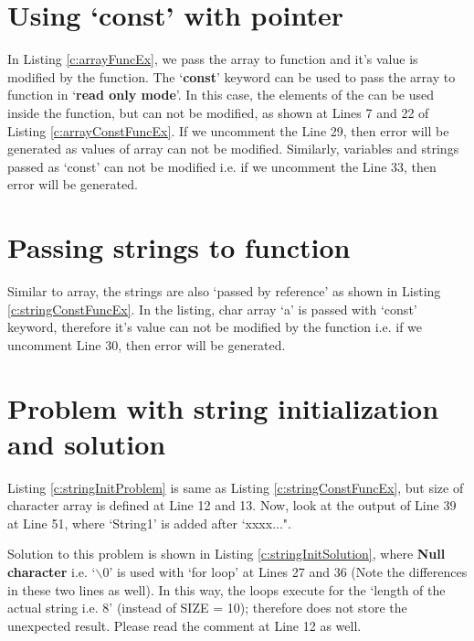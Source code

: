 
\section{Using `const' with pointer}
In Listing \ref{c:arrayFuncEx}, we pass the array to function and it's value is modified by the function. The `\textbf{const}' keyword can be used to pass the array to function in `\textbf{read only mode}'. In this case, the elements of the can be used inside the function, but can not be modified, as shown at Lines 7 and 22 of Listing \ref{c:arrayConstFuncEx}. If we uncomment the Line 29, then error will be generated as values of array can not be modified. Similarly, variables and strings passed as `const' can not be modified i.e. if we uncomment the Line 33, then error will be generated. 



\section{Passing strings to function}
Similar to array, the strings are also `passed by reference' as shown in Listing \ref{c:stringConstFuncEx}. In the listing, char array `a' is passed with `const' keyword, therefore it's value can not be modified by the function i.e. if we uncomment Line 30, then error will be generated.  



\section{Problem with string initialization and solution}
Listing \ref{c:stringInitProblem} is same as Listing \ref{c:stringConstFuncEx}, but size of character array is defined at Line 12 and 13. Now, look at the output of Line 39 at Line 51, where `String1' is added after `xxxx...".
\begin{noNumBox}
	 Solution to this problem is shown in Listing \ref{c:stringInitSolution}, where \textbf{Null character} i.e. `$\backslash 0$' is used with `for loop' at Lines 27 and 36 (Note the differences in these two lines as well).  In this way, the loops execute for the `length of the actual string i.e. 8' (instead of SIZE = 10); therefore does not store the unexpected result.  Please read the comment at Line 12 as well. 
\end{noNumBox}

